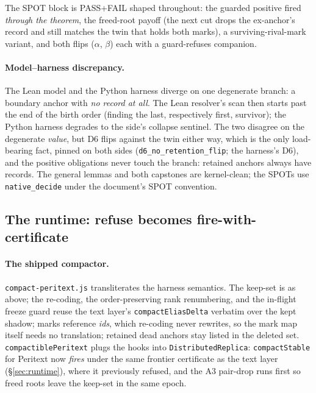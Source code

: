 \documentclass[11pt]{article}
\newcommand{\lean}[1]{\texttt{#1}}
\newcommand{\code}[1]{\texttt{#1}}
\begin{document}
\noindent The SPOT block is PASS+FAIL shaped throughout: the guarded
positive fired \emph{through the theorem}, the freed-root payoff (the
next cut drops the ex-anchor's record and still matches the twin that
holds both marks), a surviving-rival-mark variant, and both flips
($\alpha$, $\beta$) each with a guard-refuses companion.

\paragraph{Model--harness discrepancy.} The Lean model and the Python harness
diverge on one degenerate branch: a boundary anchor with \emph{no
record at all}. The Lean resolver's scan then starts past the end of
the birth order (finding the last, respectively first, survivor); the
Python harness degrades to the side's collapse sentinel. The two
disagree on the degenerate \emph{value}, but D6 flips against the twin
either way, which is the only load-bearing fact, pinned on both sides
(\lean{d6\_no\_retention\_flip}; the harness's D6), and the positive
obligations never touch the branch: retained anchors always have
records. The general lemmas and both capstones are kernel-clean; the
SPOTs use \lean{native\_decide} under the document's SPOT convention.

\subsection{The runtime: refuse becomes fire-with-certificate}
\label{sec:marksruntime}

\paragraph{The shipped compactor.} \code{compact-peritext.js}
transliterates the harness semantics. The keep-set is as above; the
re-coding, the order-preserving rank renumbering, and the in-flight
freeze guard reuse the text layer's \code{compactEliasDelta} verbatim
over the kept shadow; marks reference \emph{ids}, which re-coding
never rewrites, so the mark map itself needs no translation; retained
dead anchors stay listed in the deleted set. \code{compactiblePeritext}
plugs the hooks into \code{DistributedReplica}: \code{compactStable}
for Peritext now \emph{fires} under the same frontier certificate as
the text layer (\S\ref{sec:runtime}), where it previously refused,
and the A3 pair-drop runs first so freed roots leave the keep-set in
the same epoch.
\end{document}
